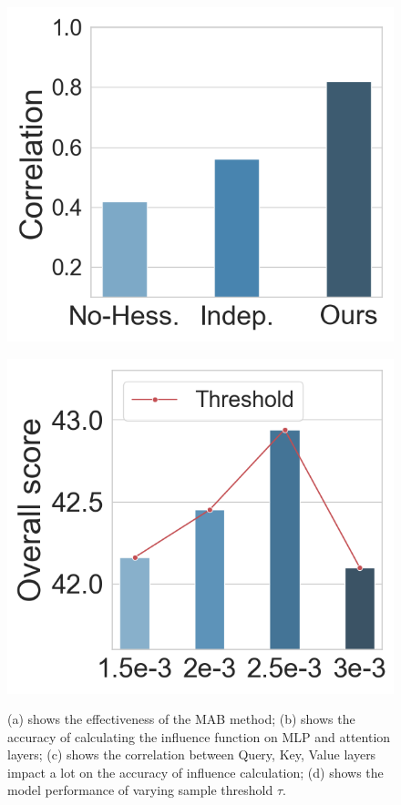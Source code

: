 \documentclass{article} %
\begin{document}
\begin{figure}
\begin{minipage}[t]{0.25\linewidth}
    \label{experiment-fig2}
  \end{minipage}%
  \begin{minipage}[t]{0.25\linewidth}
    \centering
    \includegraphics[scale=0.23]{exp-fig6.png}
    \label{experiment-fig6}
  \end{minipage}%
  \begin{minipage}[t]{0.25\linewidth}
    \centering
    \includegraphics[scale=0.23]{exp-fig4.png}
    \label{experiment-fig4}
  \end{minipage}
  \caption{(a) shows the effectiveness of the MAB method; (b) shows the accuracy of calculating the influence function on MLP and attention layers; (c) shows the correlation between Query, Key, Value layers impact a lot on the accuracy of influence calculation; (d) shows the model performance of varying sample threshold $\tau$.}
  \label{fig:experiment2}
\end{figure}
\end{document}
